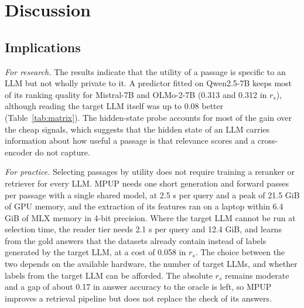 \documentclass[preprint,12pt,authoryear]{elsarticle}
\begin{document}
\section{Discussion}\label{sec:discussion}
\subsection{Implications}
\textit{For research.} The results indicate that the utility of a passage is specific to an LLM but not wholly private to it. A predictor fitted on Qwen2.5-7B keeps most of its ranking quality for Mistral-7B and OLMo-2-7B (0.313 and 0.312 in $r_s$), although reading the target LLM itself was up to 0.08 better (Table~\ref{tab:matrix}). The hidden-state probe accounts for most of the gain over the cheap signals, which suggests that the hidden state of an LLM carries information about how useful a passage is that relevance scores and a cross-encoder do not capture.

\textit{For practice.} Selecting passages by utility does not require training a reranker or retriever for every LLM. MPUP needs one short generation and forward passes per passage with a single shared model, at 2.5 s per query and a peak of 21.5 GiB of GPU memory, and the extraction of its features ran on a laptop within 6.4 GiB of MLX memory in 4-bit precision. Where the target LLM cannot be run at selection time, the reader tier needs 2.1 s per query and 12.4 GiB, and learns from the gold answers that the datasets already contain instead of labels generated by the target LLM, at a cost of 0.058 in $r_s$. The choice between the two depends on the available hardware, the number of target LLMs, and whether labels from the target LLM can be afforded. The absolute $r_s$ remains moderate and a gap of about 0.17 in answer accuracy to the oracle is left, so MPUP improves a retrieval pipeline but does not replace the check of its answers.
\end{document}
